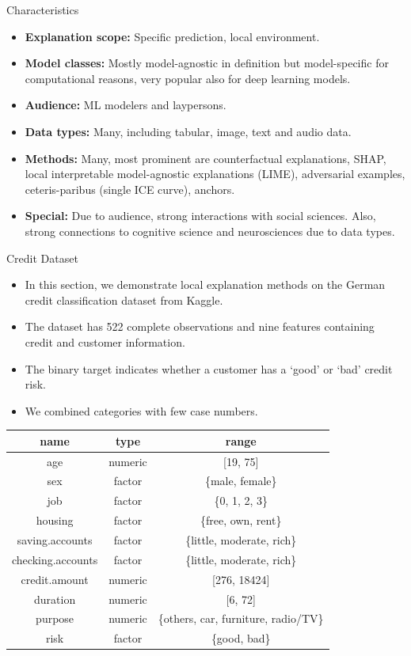 \documentclass[11pt,compress,t,notes=noshow, xcolor=table]{beamer}
\begin{document}
\begin{vbframe}{Characteristics}
	\begin{itemize}
		\item \textbf{Explanation scope:} Specific prediction, local environment.
		\item \textbf{Model classes:} Mostly model-agnostic in definition but model-specific for computational reasons, very popular also for deep learning models.
		\item \textbf{Audience:} ML modelers and laypersons.
		\item \textbf{Data types:} Many, including tabular, image, text and audio data.
		\item \textbf{Methods:} Many, most prominent are counterfactual explanations, SHAP, local interpretable model-agnostic explanations (LIME), adversarial examples, ceteris-paribus (single ICE curve), anchors.
		\item \textbf{Special:} Due to audience, strong interactions with social sciences. Also, strong connections to cognitive science and neurosciences due to data types.
	\end{itemize}
\end{vbframe}

\begin{vbframe}{Credit Dataset}

	\begin{itemize}
		\item In this section, we demonstrate local explanation methods on the German credit classification dataset from Kaggle. \href{https://www.kaggle.com/uciml/german-credit}{}
		\item The dataset has 522 complete observations and nine features containing credit and customer information.
		\item The binary target indicates whether a customer has a `good' or `bad' credit risk.  
		\item We combined categories with few case numbers. 
	\end{itemize}
		\begin{center}
			\footnotesize
			\begin{tabular}{ccc}
				\hline
				name & type & range\\
				\hline
				age & numeric & [19, 75]\\
				sex & factor & \{male, female\}\\
				job & factor & \{0, 1, 2, 3\}\\
				housing & factor & \{free, own, rent\}\\
				saving.accounts & factor & \{little, moderate, rich\}\\
				checking.accounts & factor & \{little, moderate, rich\}\\
				credit.amount & numeric & [276, 18424]\\
				duration & numeric &  [6, 72]\\
				purpose & numeric &  \{others, car, furniture, radio/TV\}\\
				risk & factor & \{good, bad\}
			\end{tabular}
		\end{center}
\end{vbframe}
\end{document}
